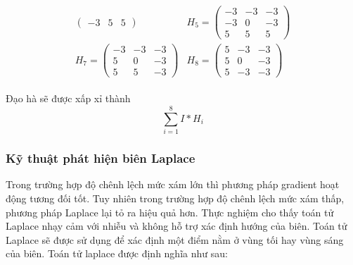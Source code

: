 \documentclass[12pt, oneside, a4]{book}
\begin{document}
\begin{itemize}
\begin{align*}
\begin{matrix}
\begin{pmatrix}
        -3 & 5 & 5
    \end{pmatrix} & H_5=\begin{pmatrix}
        -3 & -3 & -3 \\
        -3 & 0 & -3  \\
        5 & 5 & 5
    \end{pmatrix}\\
        H_7=\begin{pmatrix}
        -3 & -3 & -3 \\
        5 & 0 & -3  \\
        5 & 5 & -3
    \end{pmatrix} & H_8=\begin{pmatrix}
        5 & -3 & -3 \\
        5 & 0 & -3  \\
        5 & -3 & -3
    \end{pmatrix}
    \end{matrix}
\end{align*}
\end{itemize}
Đạo hà sẽ được xấp xỉ thành $$\sum_{i=1}^{8} I\ast H_i$$
\subsubsection{Kỹ thuật phát hiện biên Laplace }
Trong trường hợp độ chênh lệch mức xám lớn thì phương pháp gradient hoạt động tương đối tốt. Tuy nhiên trong trường hợp độ chênh lệch mức xám thấp, phương pháp Laplace lại tỏ ra hiệu quả hơn. Thực nghiệm cho thấy toán tử Laplace nhạy cảm với nhiễu và không hỗ trợ xác định hướng của biên. Toán tử Laplace sẽ được sử dụng để xác định một điểm nằm ở vùng tối hay vùng sáng của biên. Toán tử laplace được định nghĩa như sau:
\end{document}
